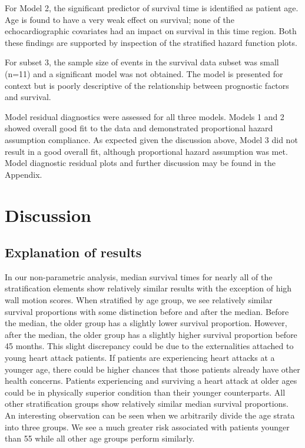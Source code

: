 \documentclass[
]{article}
\begin{document}
For Model 2, the significant predictor of survival time is identified as
patient age. Age is found to have a very weak effect on survival; none
of the echocardiographic covariates had an impact on survival in this
time region. Both these findings are supported by inspection of the
stratified hazard function plots.

For subset 3, the sample size of events in the survival data subset was
small (n=11) and a significant model was not obtained. The model is
presented for context but is poorly descriptive of the relationship
between prognostic factors and survival.

Model residual diagnostics were assessed for all three models. Models 1
and 2 showed overall good fit to the data and demonstrated proportional
hazard assumption compliance. As expected given the discussion above,
Model 3 did not result in a good overall fit, although proportional
hazard assumption was met. Model diagnostic residual plots and further
discussion may be found in the Appendix.

\hypertarget{discussion}{%
\section{Discussion}\label{discussion}}

\hypertarget{explanation-of-results}{%
\subsection{Explanation of results}\label{explanation-of-results}}

In our non-parametric analysis, median survival times for nearly all of
the stratification elements show relatively similar results with the
exception of high wall motion scores. When stratified by age group, we
see relatively similar survival proportions with some distinction before
and after the median. Before the median, the older group has a slightly
lower survival proportion. However, after the median, the older group
has a slightly higher survival proportion before 45 months. This slight
discrepancy could be due to the externalities attached to young heart
attack patients. If patients are experiencing heart attacks at a younger
age, there could be higher chances that those patients already have
other health concerns. Patients experiencing and surviving a heart
attack at older ages could be in physically superior condition than
their younger counterparts. All other stratification groups show
relatively similar median survival proportions. An interesting
observation can be seen when we arbitrarily divide the age strata into
three groups. We see a much greater risk associated with patients
younger than 55 while all other age groups perform similarly.
\end{document}
